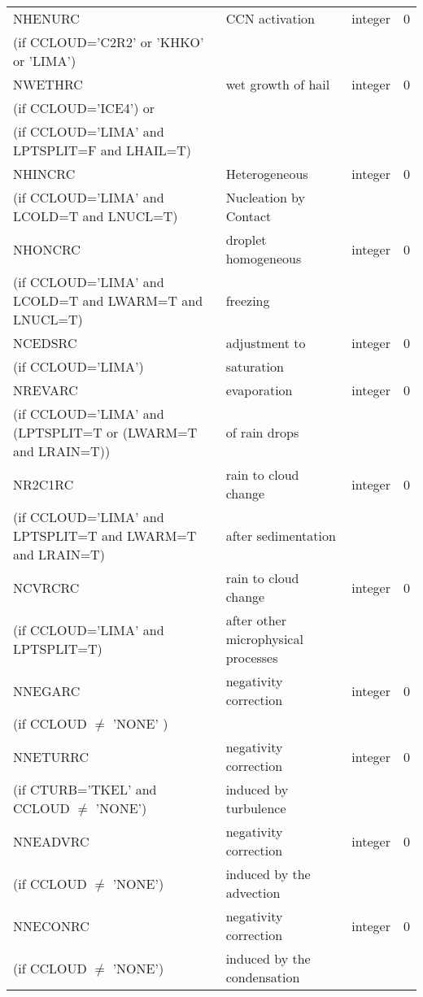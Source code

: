 \begin{longtable} {|p{}|p{}|>{\centering}p{}|p{}<{\centering}|}
NHENURC  & CCN activation  & integer  &  0 \index{NHENURC!\innam{NAM\_BU\_RRC}}\\ \nopagebreak
(if CCLOUD='C2R2' or 'KHKO' or 'LIMA') & &   &  \\\hline
NWETHRC  & wet growth of hail & integer  &  0 \index{NWETHRC!\innam{NAM\_BU\_RRC}}\\ \nopagebreak
(if CCLOUD='ICE4') or & &   &  \\ \nopagebreak
(if CCLOUD='LIMA' and LPTSPLIT=F and LHAIL=T) & &   &  \\\hline
NHINCRC  & Heterogeneous  & integer  &  0 \index{NHINCRC!\innam{NAM\_BU\_RRC}}\\ \nopagebreak
(if CCLOUD='LIMA' and LCOLD=T and LNUCL=T)   & Nucleation by Contact  &       &   \\\hline
NHONCRC  & droplet homogeneous   & integer  &  0 \index{NHONCRC!\innam{NAM\_BU\_RRC}}\\ \nopagebreak
(if CCLOUD='LIMA' and LCOLD=T and LWARM=T and LNUCL=T)   &freezing   &       &   \\\hline
NCEDSRC  & adjustment to & integer  &  0 \index{NCEDSRC!\innam{NAM\_BU\_RRC}}\\ \nopagebreak
(if CCLOUD='LIMA') &saturation &   &  \\\hline
NREVARC  & evaporation   & integer  &  0 \index{NREVARC!\innam{NAM\_BU\_RRC}}\\ \nopagebreak
(if CCLOUD='LIMA' and (LPTSPLIT=T or (LWARM=T and LRAIN=T)) & of rain drops &   &  \\\hline
NR2C1RC  & rain to cloud change & integer  &  0 \index{NR2C1RC!\innam{NAM\_BU\_RRC}}\\ \nopagebreak
(if CCLOUD='LIMA' and LPTSPLIT=T and LWARM=T and LRAIN=T) & after sedimentation &   &  \\\hline
NCVRCRC  & rain to cloud change & integer  &  0 \index{NCVRCRC!\innam{NAM\_BU\_RRC}}\\ \nopagebreak
(if CCLOUD='LIMA' and LPTSPLIT=T) &after other microphysical processes &   &  \\\hline
NNEGARC   & negativity correction & integer  &  0 \index{NNEGARC!\innam{NAM\_BU\_RRC}}\\ \nopagebreak
(if CCLOUD $\neq$ 'NONE' )& &   &  \\\hline
NNETURRC  &negativity correction   & integer  &  0 \index{NNETURRC!\innam{NAM\_BU\_RRC}}\\ \nopagebreak
(if CTURB='TKEL' and CCLOUD $\neq$ 'NONE')   &induced by turbulence   &       &   \\\hline
NNEADVRC  & negativity correction  & integer  &  0 \index{NNEADVRC!\innam{NAM\_BU\_RRC}}\\ \nopagebreak
(if CCLOUD $\neq$ 'NONE') & induced by the advection&   &  \\\hline
NNECONRC  &negativity correction    & integer  &  0 \index{NNECONRC!\innam{NAM\_BU\_RRC}}\\ \nopagebreak
(if CCLOUD $\neq$ 'NONE') &induced by the condensation &   &  \\\hline
\end{longtable}

